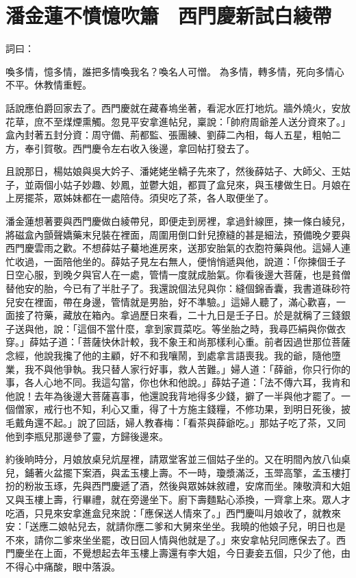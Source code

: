%

\chapter{潘金蓮不憤憶吹簫　西門慶新試白綾帶}

詞曰：

喚多情，憶多情，誰把多情喚我名？喚名人可憎。
為多情，轉多情，死向多情心不平。休教情重輕。

話說應伯爵回家去了。西門慶就在藏春塢坐著，看泥水匠打地炕。牆外燒火，安放花草，庶不至煤煙熏觸。忽見平安拿進帖兒，稟說：「帥府周爺差人送分資來了。」盒內封著五封分資：周守備、荊都監、張團練、劉薛二內相，每人五星，粗帕二方，奉引賀敬。西門慶令左右收入後邊，拿回帖打發去了。

且說那日，楊姑娘與吳大妗子、潘姥姥坐轎子先來了，然後薛姑子、大師父、王姑子，並兩個小姑子妙趣、妙鳳，並鬱大姐，都買了盒兒來，與玉樓做生日。月娘在上房擺茶，眾姊妹都在一處陪侍。須臾吃了茶，各人取便坐了。

潘金蓮想著要與西門慶做白綾帶兒，即便走到房裡，拿過針線匣，揀一條白綾兒，將磁盒內顫聲嬌藥末兒裝在裡面，周圍用倒口針兒撩縫的甚是細法，預備晚夕要與西門慶雲雨之歡。不想薛姑子驀地進房來，送那安胎氣的衣胞符藥與他。這婦人連忙收過，一面陪他坐的。薛姑子見左右無人，便悄悄遞與他，說道：「你揀個壬子日空心服，到晚夕與官人在一處，管情一度就成胎氣。你看後邊大菩薩，也是貧僧替他安的胎，今已有了半肚子了。我還說個法兒與你：縫個錦香囊，我書道硃砂符兒安在裡面，帶在身邊，管情就是男胎，好不準驗。」這婦人聽了，滿心歡喜，一面接了符藥，藏放在箱內。拿過歷日來看，二十九日是壬子日。於是就稱了三錢銀子送與他，說：「這個不當什麼，拿到家買菜吃。等坐胎之時，我尋匹絹與你做衣穿。」薛姑子道：「菩薩快休計較，我不象王和尚那樣利心重。前者因過世那位菩薩念經，他說我攙了他的主顧，好不和我嚷鬧，到處拿言語喪我。我的爺，隨他墮業，我不與他爭執。我只替人家行好事，救人苦難。」婦人道：「薛爺，你只行你的事，各人心地不同。我這勾當，你也休和他說。」薛姑子道：「法不傳六耳，我肯和他說！去年為後邊大菩薩喜事，他還說我背地得多少錢，擗了一半與他才罷了。一個僧家，戒行也不知，利心又重，得了十方施主錢糧，不修功果，到明日死後，披毛戴角還不起。」說了回話，婦人教春梅：「看茶與薛爺吃。」那姑子吃了茶，又同他到李瓶兒那邊參了靈，方歸後邊來。

約後晌時分，月娘放桌兒炕屋裡，請眾堂客並三個姑子坐的。又在明間內放八仙桌兒，鋪著火盆擺下案酒，與孟玉樓上壽。不一時，瓊漿滿泛，玉斝高擎，孟玉樓打扮的粉妝玉琢，先與西門慶遞了酒，然後與眾姊妹敘禮，安席而坐。陳敬濟和大姐又與玉樓上壽，行畢禮，就在旁邊坐下。廚下壽麵點心添換，一齊拿上來。眾人才吃酒，只見來安拿進盒兒來說：「應保送人情來了。」西門慶叫月娘收了，就教來安：「送應二娘帖兒去，就請你應二爹和大舅來坐坐。我曉的他娘子兒，明日也是不來，請你二爹來坐坐罷，改日回人情與他就是了。」來安拿帖兒同應保去了。西門慶坐在上面，不覺想起去年玉樓上壽還有李大姐，今日妻妾五個，只少了他，由不得心中痛酸，眼中落淚。

